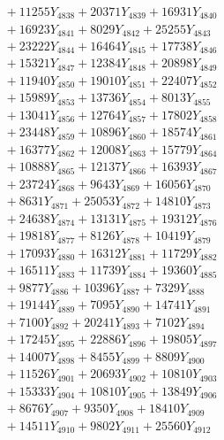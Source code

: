 \documentclass[a4paper,10pt]{article}
\begin{document}
{\begin{align}
&\;  + 11255 Y_{4838} + 20371 Y_{4839} + 16931 Y_{4840} \\[0.3ex]
&\;  + 16923 Y_{4841} + 8029 Y_{4842} + 25255 Y_{4843} \\[0.3ex]
&\;  + 23222 Y_{4844} + 16464 Y_{4845} + 17738 Y_{4846} \\[0.3ex]
&\;  + 15321 Y_{4847} + 12384 Y_{4848} + 20898 Y_{4849} \\[0.3ex]
&\;  + 11940 Y_{4850} + 19010 Y_{4851} + 22407 Y_{4852} \\[0.3ex]
&\;  + 15989 Y_{4853} + 13736 Y_{4854} + 8013 Y_{4855} \\[0.3ex]
&\;  + 13041 Y_{4856} + 12764 Y_{4857} + 17802 Y_{4858} \\[0.5ex]\allowbreak
&\;  + 23448 Y_{4859} + 10896 Y_{4860} + 18574 Y_{4861} \\[0.3ex]
&\;  + 16377 Y_{4862} + 12008 Y_{4863} + 15779 Y_{4864} \\[0.3ex]
&\;  + 10888 Y_{4865} + 12137 Y_{4866} + 16393 Y_{4867} \\[0.3ex]
&\;  + 23724 Y_{4868} + 9643 Y_{4869} + 16056 Y_{4870} \\[0.3ex]
&\;  + 8631 Y_{4871} + 25053 Y_{4872} + 14810 Y_{4873} \\[0.3ex]
&\;  + 24638 Y_{4874} + 13131 Y_{4875} + 19312 Y_{4876} \\[0.3ex]
&\;  + 19818 Y_{4877} + 8126 Y_{4878} + 10419 Y_{4879} \\[0.3ex]
&\;  + 17093 Y_{4880} + 16312 Y_{4881} + 11729 Y_{4882} \\[0.3ex]
&\;  + 16511 Y_{4883} + 11739 Y_{4884} + 19360 Y_{4885} \\[0.3ex]
&\;  + 9877 Y_{4886} + 10396 Y_{4887} + 7329 Y_{4888} \\[0.5ex]\allowbreak
&\;  + 19144 Y_{4889} + 7095 Y_{4890} + 14741 Y_{4891} \\[0.3ex]
&\;  + 7100 Y_{4892} + 20241 Y_{4893} + 7102 Y_{4894} \\[0.3ex]
&\;  + 17245 Y_{4895} + 22886 Y_{4896} + 19805 Y_{4897} \\[0.3ex]
&\;  + 14007 Y_{4898} + 8455 Y_{4899} + 8809 Y_{4900} \\[0.3ex]
&\;  + 11526 Y_{4901} + 20693 Y_{4902} + 10810 Y_{4903} \\[0.3ex]
&\;  + 15333 Y_{4904} + 10810 Y_{4905} + 13849 Y_{4906} \\[0.3ex]
&\;  + 8676 Y_{4907} + 9350 Y_{4908} + 18410 Y_{4909} \\[0.3ex]
&\;  + 14511 Y_{4910} + 9802 Y_{4911} + 25560 Y_{4912} \\[0.3ex]

\end{align}}
\end{document}
